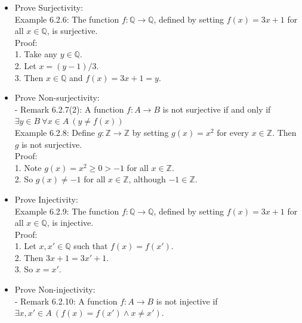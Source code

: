 \documentclass{article}
\begin{document}
\begin{itemize}
        \bigskip
    \item Prove Surjectivity:
        \\ Example 6.2.6: The function $f: \mathbb{Q} \xrightarrow{} \mathbb{Q}$, defined by setting $f(x)=3x+1$ for all $x \in \mathbb{Q}$, is surjective.
        \bigskip
        \\ Proof:
        \\ \hspace*{3mm} 1. Take any $y \in \mathbb{Q}$.
        \\ \hspace*{3mm} 2. Let $x=(y-1)/3$.
        \\ \hspace*{3mm} 3. Then $x \in \mathbb{Q}$ and $f(x) = 3x+1=y$.
    \item Prove Non-surjectivity:
        \\ - Remark 6.2.7(2): A function $f:A\xrightarrow{} B$ is not surjective if and only if $\exists y \in B \ \forall x \in A\ (y\neq f(x))$
        \bigskip
        \\ Example 6.2.8: Define $g: \mathbb{Z} \xrightarrow{} \mathbb{Z}$ by setting $g(x) = x^2$ for every $x \in \mathbb{Z}$. Then $g$ is not \mbox{surjective}.
        \bigskip
        \\ Proof:
        \\ \hspace*{3mm} 1. Note $g(x) = x^2 \geq 0 > -1$ for all $x \in \mathbb{Z}$.
        \\ \hspace*{3mm} 2. So $g(x) \neq -1$ for all $x \in \mathbb{Z}$, although $-1 \in \mathbb{Z}$.
    \item Prove Injectivity:
        \\ Example 6.2.9: The function $f: \mathbb{Q} \xrightarrow{} \mathbb{Q}$, defined by setting $f(x) = 3x+1$ for all $x\in \mathbb{Q}$, is injective.
        \bigskip
        \\ Proof:
        \\ \hspace*{3mm} 1. Let $x,x'\in \mathbb{Q}$ such that $f(x)=f(x')$.
        \\ \hspace*{3mm} 2. Then $3x+1=3x'+1$.
        \\ \hspace*{3mm} 3. So $x=x'$.
    \item Prove Non-injectivity:
        \\- Remark 6.2.10: A function $f:A \xrightarrow{} B$ is not injective if $\exists x,x' \in A\ (f(x)=f(x')\land x\neq x')$.

\end{itemize}
\end{document}
